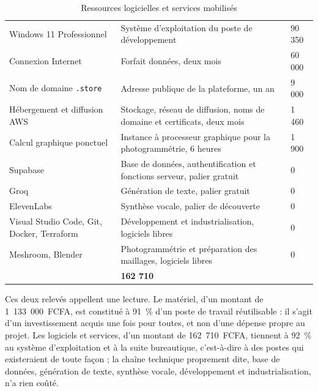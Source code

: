 \begin{table}[!ht]
\centering
\caption{Ressources logicielles et services mobilisés}
\label{tab:logiciel}
\small
\begin{tabularx}{\textwidth}{|L{4.4cm}|X|R{2.4cm}|}
\hline
{}
 &  &  \\ \hline
Windows 11 Professionnel & Système d'exploitation du poste de développement & 90 350 \\ \hline
Connexion Internet & Forfait données, deux mois & 60 000 \\ \hline
Nom de domaine \texttt{.store} & Adresse publique de la plateforme, un an & 9 000 \\ \hline
Hébergement et diffusion AWS & Stockage, réseau de diffusion, noms de domaine et certificats, deux mois & 1 460 \\ \hline
Calcul graphique ponctuel & Instance à processeur graphique pour la photogrammétrie, 6 heures & 1 900 \\ \hline
Supabase & Base de données, authentification et fonctions serveur, palier gratuit & 0 \\ \hline
Groq & Génération de texte, palier gratuit & 0 \\ \hline
ElevenLabs & Synthèse vocale, palier de découverte & 0 \\ \hline
Visual Studio Code, Git, Docker, Terraform & Développement et industrialisation, logiciels libres & 0 \\ \hline
Meshroom, Blender & Photogrammétrie et préparation des maillages, logiciels libres & 0 \\ \hline
{}
 & \textbf{162 710} \\ \hline
\end{tabularx}
\end{table}

Ces deux relevés appellent une lecture. Le matériel, d'un montant de
1~133~000~FCFA, est constitué à 91~\% d'un poste de travail réutilisable : il
s'agit d'un investissement acquis une fois pour toutes, et non d'une dépense
propre au projet. Les logiciels et services, d'un montant de 162~710~FCFA,
tiennent à 92~\% au système d'exploitation et à la suite bureautique,
c'est-à-dire à des postes qui existeraient de toute façon ; la chaîne technique
proprement dite, base de données, génération de texte, synthèse vocale,
développement et industrialisation, n'a rien coûté.

